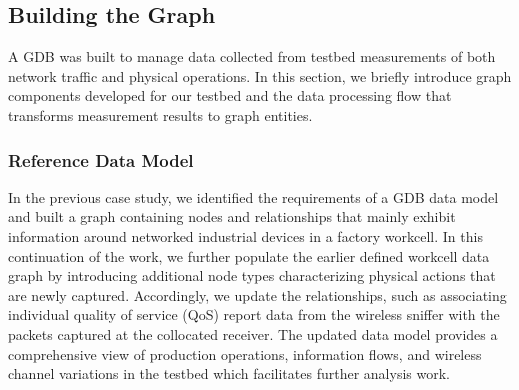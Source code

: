 \subsection{Building the Graph} \label{gdbappl:sec:graph}

A GDB was built to manage data collected from testbed measurements of both network traffic and physical operations.
In this section, we briefly introduce graph components developed for our testbed and the data processing flow that transforms measurement results to graph entities. 

\subsubsection{Reference Data Model}
In the previous case study, we identified the requirements of a GDB data model and built a graph containing nodes and relationships that mainly exhibit information around networked industrial devices in a factory workcell. In this continuation of the work, we further populate the earlier defined workcell data graph by introducing additional node types characterizing physical actions that are newly captured. Accordingly, we update the relationships, such as associating individual quality of service (QoS) report data from the wireless sniffer with the packets captured at the collocated receiver. The updated data model provides a comprehensive view of production operations, information flows, and wireless channel variations in the testbed which facilitates further analysis work.  

